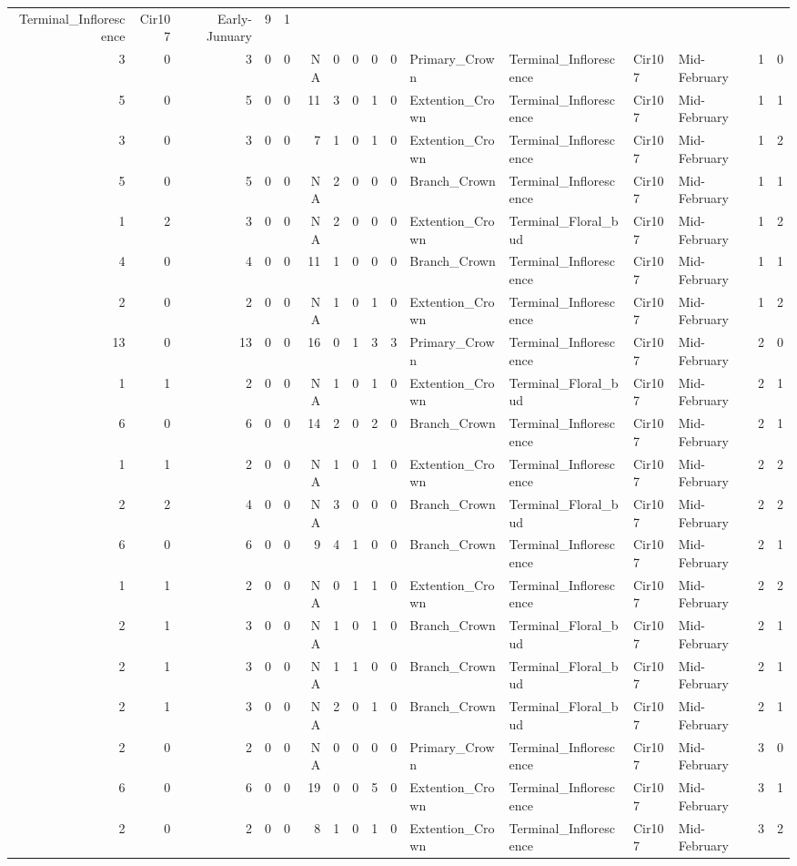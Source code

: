 \documentclass[]{article}
\begin{document}
\begin{longtable}[]{@{}rrrrrrrrrrllllrl@{}}
Terminal\_Inflorescence & Cir107 & Early-Junuary & 9 & 1\tabularnewline
3 & 0 & 3 & 0 & 0 & NA & 0 & 0 & 0 & 0 & Primary\_Crown &
Terminal\_Inflorescence & Cir107 & Mid-February & 1 & 0\tabularnewline
5 & 0 & 5 & 0 & 0 & 11 & 3 & 0 & 1 & 0 & Extention\_Crown &
Terminal\_Inflorescence & Cir107 & Mid-February & 1 & 1\tabularnewline
3 & 0 & 3 & 0 & 0 & 7 & 1 & 0 & 1 & 0 & Extention\_Crown &
Terminal\_Inflorescence & Cir107 & Mid-February & 1 & 2\tabularnewline
5 & 0 & 5 & 0 & 0 & NA & 2 & 0 & 0 & 0 & Branch\_Crown &
Terminal\_Inflorescence & Cir107 & Mid-February & 1 & 1\tabularnewline
1 & 2 & 3 & 0 & 0 & NA & 2 & 0 & 0 & 0 & Extention\_Crown &
Terminal\_Floral\_bud & Cir107 & Mid-February & 1 & 2\tabularnewline
4 & 0 & 4 & 0 & 0 & 11 & 1 & 0 & 0 & 0 & Branch\_Crown &
Terminal\_Inflorescence & Cir107 & Mid-February & 1 & 1\tabularnewline
2 & 0 & 2 & 0 & 0 & NA & 1 & 0 & 1 & 0 & Extention\_Crown &
Terminal\_Inflorescence & Cir107 & Mid-February & 1 & 2\tabularnewline
13 & 0 & 13 & 0 & 0 & 16 & 0 & 1 & 3 & 3 & Primary\_Crown &
Terminal\_Inflorescence & Cir107 & Mid-February & 2 & 0\tabularnewline
1 & 1 & 2 & 0 & 0 & NA & 1 & 0 & 1 & 0 & Extention\_Crown &
Terminal\_Floral\_bud & Cir107 & Mid-February & 2 & 1\tabularnewline
6 & 0 & 6 & 0 & 0 & 14 & 2 & 0 & 2 & 0 & Branch\_Crown &
Terminal\_Inflorescence & Cir107 & Mid-February & 2 & 1\tabularnewline
1 & 1 & 2 & 0 & 0 & NA & 1 & 0 & 1 & 0 & Extention\_Crown &
Terminal\_Inflorescence & Cir107 & Mid-February & 2 & 2\tabularnewline
2 & 2 & 4 & 0 & 0 & NA & 3 & 0 & 0 & 0 & Branch\_Crown &
Terminal\_Floral\_bud & Cir107 & Mid-February & 2 & 2\tabularnewline
6 & 0 & 6 & 0 & 0 & 9 & 4 & 1 & 0 & 0 & Branch\_Crown &
Terminal\_Inflorescence & Cir107 & Mid-February & 2 & 1\tabularnewline
1 & 1 & 2 & 0 & 0 & NA & 0 & 1 & 1 & 0 & Extention\_Crown &
Terminal\_Inflorescence & Cir107 & Mid-February & 2 & 2\tabularnewline
2 & 1 & 3 & 0 & 0 & NA & 1 & 0 & 1 & 0 & Branch\_Crown &
Terminal\_Floral\_bud & Cir107 & Mid-February & 2 & 1\tabularnewline
2 & 1 & 3 & 0 & 0 & NA & 1 & 1 & 0 & 0 & Branch\_Crown &
Terminal\_Floral\_bud & Cir107 & Mid-February & 2 & 1\tabularnewline
2 & 1 & 3 & 0 & 0 & NA & 2 & 0 & 1 & 0 & Branch\_Crown &
Terminal\_Floral\_bud & Cir107 & Mid-February & 2 & 1\tabularnewline
2 & 0 & 2 & 0 & 0 & NA & 0 & 0 & 0 & 0 & Primary\_Crown &
Terminal\_Inflorescence & Cir107 & Mid-February & 3 & 0\tabularnewline
6 & 0 & 6 & 0 & 0 & 19 & 0 & 0 & 5 & 0 & Extention\_Crown &
Terminal\_Inflorescence & Cir107 & Mid-February & 3 & 1\tabularnewline
2 & 0 & 2 & 0 & 0 & 8 & 1 & 0 & 1 & 0 & Extention\_Crown &
Terminal\_Inflorescence & Cir107 & Mid-February & 3 & 2\tabularnewline

\end{longtable}
\end{document}

